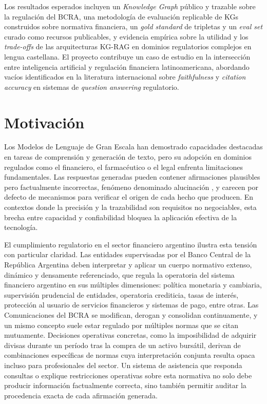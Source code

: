 \documentclass[12pt,a4paper]{article}
\begin{document}
Los resultados esperados incluyen un \textit{Knowledge Graph} público y trazable sobre la regulación del BCRA, una metodología de evaluación replicable de KGs construidos sobre normativa financiera, un \textit{gold standard} de tripletas y un \textit{eval set} curado como recursos publicables, y evidencia empírica sobre la utilidad y los \textit{trade-offs} de las arquitecturas KG-RAG en dominios regulatorios complejos en lengua castellana. El proyecto contribuye un caso de estudio en la intersección entre inteligencia artificial y regulación financiera latinoamericana, abordando vacíos identificados en la literatura internacional sobre \textit{faithfulness} y \textit{citation accuracy} en sistemas de \textit{question answering} regulatorio.

\section{Motivación}
Los Modelos de Lenguaje de Gran Escala han demostrado capacidades destacadas en tareas de comprensión y generación de texto, pero su adopción en dominios regulados como el financiero, el farmacéutico o el legal enfrenta limitaciones fundamentales. Las respuestas generadas pueden contener afirmaciones plausibles pero factualmente incorrectas, fenómeno denominado alucinación \cite{ji2023hallucination}, y carecen por defecto de mecanismos para verificar el origen de cada hecho que producen. En contextos donde la precisión y la trazabilidad son requisitos no negociables, esta brecha entre capacidad y confiabilidad bloquea la aplicación efectiva de la tecnología.
 
El cumplimiento regulatorio en el sector financiero argentino ilustra esta tensión con particular claridad. Las entidades supervisadas por el Banco Central de la República Argentina deben interpretar y aplicar un cuerpo normativo extenso, dinámico y densamente referenciado, que regula la operatoria del sistema financiero argentino en sus múltiples dimensiones: política monetaria y cambiaria, supervisión prudencial de entidades, operatoria crediticia, tasas de interés, protección al usuario de servicios financieros y sistemas de pago, entre otras. Las Comunicaciones del BCRA se modifican, derogan y consolidan continuamente, y un mismo concepto suele estar regulado por múltiples normas que se citan mutuamente. Decisiones operativas concretas, como la imposibilidad de adquirir divisas durante un período tras la compra de un activo bursátil, derivan de combinaciones específicas de normas cuya interpretación conjunta resulta opaca incluso para profesionales del sector. Un sistema de asistencia que responda consultas o explique restricciones operativas sobre esta normativa no solo debe producir información factualmente correcta, sino también permitir auditar la procedencia exacta de cada afirmación generada.
 
\end{document}
